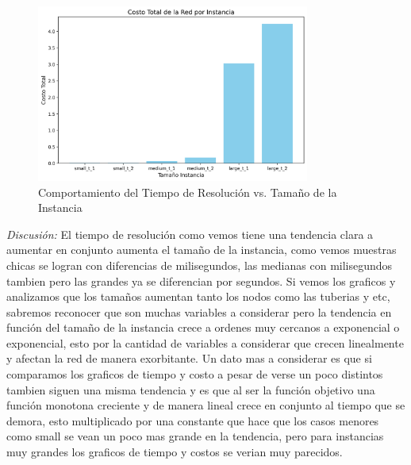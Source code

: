 \documentclass[12pt]{article}
\begin{document}
\begin{figure}[H]
    \centering
    \includegraphics[width=0.8\textwidth]{time_values.png}
    \caption{Comportamiento del Tiempo de Resolución vs. Tamaño de la Instancia}
    \label{fig:tiempo_comportamiento}
\end{figure}

\textit{Discusión:}
El tiempo de resolución como vemos tiene una tendencia clara a aumentar en conjunto aumenta el tamaño de la instancia, como vemos muestras chicas se logran con diferencias de milisegundos, las medianas con milisegundos tambien pero las grandes ya se diferencian por segundos. Si vemos los graficos y analizamos que los tamaños aumentan tanto los nodos como las tuberias y etc, sabremos reconocer que son muchas variables a considerar pero la tendencia en función del tamaño de la instancia crece a ordenes muy cercanos a exponencial o exponencial, esto por la cantidad de variables a considerar que crecen linealmente y afectan la red de manera exorbitante. Un dato mas a considerar es que si comparamos los graficos de tiempo y costo a pesar de verse un poco distintos tambien siguen una misma tendencia y es que al ser la función objetivo una función monotona creciente y de manera lineal crece en conjunto al tiempo que se demora, esto multiplicado por una constante que hace que los casos menores como small se vean un poco mas grande en la tendencia, pero para instancias muy grandes los graficos de tiempo y costos se verian muy parecidos.
\end{document}
